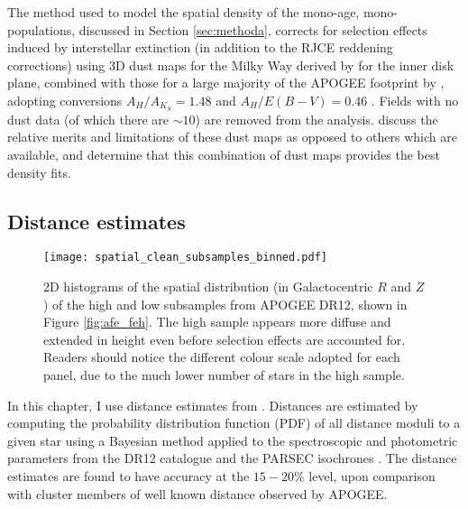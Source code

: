 The method used to model the spatial density of the mono-age, mono-\feh{} populations, discussed in Section \ref{sec:methoda}, corrects for selection effects induced by interstellar extinction (in addition to the RJCE reddening corrections) using 3D dust maps for the Milky Way derived by \citet{2006A&A...453..635M} for the inner disk plane, combined with those for a large majority of the APOGEE footprint by \citep{2015ApJ...810...25G}, adopting conversions $A_H/A_{K_S}=1.48$ and $A_H/E(B-V) = 0.46$ \citep{2011ApJ...737..103S,2013MNRAS.430.2188Y}.  Fields with no dust data (of which there are $\sim 10$) are removed from the analysis. \citet{2016ApJ...823...30B} discuss the relative merits and limitations of these dust maps as opposed to others which are available, and determine that this combination of dust maps provides the best density fits.


 \subsection{Distance estimates}
 \label{sec:distances}
 
  \begin{figure}
 \centering
 	\texttt{[image: spatial\_clean\_subsamples\_binned.pdf]}
     \caption[The Galactocentric $R$ and $z$ distribution of stars in the APOGEE DR12 high and low \afe{} populations]{2D histograms of the spatial distribution (in Galactocentric $R$ and $Z$) of the high and low \afe{} subsamples from APOGEE DR12, shown in Figure \ref{fig:afe_feh}. The high \afe{} sample appears more diffuse and extended in height even before selection effects are accounted for. Readers should notice the different colour scale adopted for each panel, due to the much lower number of stars in the high \afe{} sample.}
     \label{fig:spatial}
 \end{figure}
In this chapter, I use distance estimates from \citet{2014AJ....147..116H} \citep[But see also][for further description]{2015ApJ...808..132H}. Distances are estimated by computing the probability distribution function (PDF) of all distance moduli to a given star using a Bayesian method applied to the spectroscopic and photometric parameters from the DR12 catalogue and the PARSEC isochrones \citep{2012MNRAS.427..127B}. The distance estimates are found to have accuracy at the $15-20\%$ level, upon comparison with cluster members of well known distance observed by APOGEE. 

